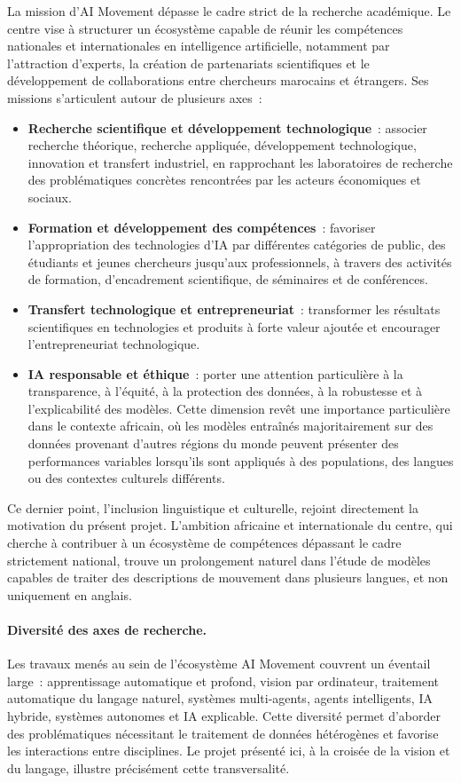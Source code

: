 \documentclass[12pt,a4paper,oneside]{report}
\theoremstyle{definition}
\theoremstyle{plain}
\begin{document}
La mission d'AI Movement dépasse le cadre strict de la recherche académique. Le
centre vise à structurer un écosystème capable de réunir les compétences
nationales et internationales en intelligence artificielle, notamment par
l'attraction d'experts, la création de partenariats scientifiques et le
développement de collaborations entre chercheurs marocains et étrangers. Ses
missions s'articulent autour de plusieurs axes~:

\begin{itemize}[leftmargin=*]
\item \textbf{Recherche scientifique et développement technologique}~: associer
recherche théorique, recherche appliquée, développement technologique, innovation
et transfert industriel, en rapprochant les laboratoires de recherche des
problématiques concrètes rencontrées par les acteurs économiques et sociaux.
\item \textbf{Formation et développement des compétences}~: favoriser
l'appropriation des technologies d'IA par différentes catégories de public, des
étudiants et jeunes chercheurs jusqu'aux professionnels, à travers des activités
de formation, d'encadrement scientifique, de séminaires et de conférences.
\item \textbf{Transfert technologique et entrepreneuriat}~: transformer les
résultats scientifiques en technologies et produits à forte valeur ajoutée et
encourager l'entrepreneuriat technologique.
\item \textbf{IA responsable et éthique}~: porter une attention particulière à la
transparence, à l'équité, à la protection des données, à la robustesse et à
l'explicabilité des modèles. Cette dimension revêt une importance particulière
dans le contexte africain, où les modèles entraînés majoritairement sur des
données provenant d'autres régions du monde peuvent présenter des performances
variables lorsqu'ils sont appliqués à des populations, des langues ou des
contextes culturels différents.
\end{itemize}

Ce dernier point, l'inclusion linguistique et culturelle, rejoint
directement la motivation du présent projet. L'ambition africaine et
internationale du centre, qui cherche à contribuer à un écosystème de
compétences dépassant le cadre strictement national, trouve un prolongement
naturel dans l'étude de modèles capables de traiter des descriptions de
mouvement dans plusieurs langues, et non uniquement en anglais.

\paragraph{Diversité des axes de recherche.} Les travaux menés au sein de
l'écosystème AI Movement couvrent un éventail large~: apprentissage automatique et
profond, vision par ordinateur, traitement automatique du langage naturel,
systèmes multi-agents, agents intelligents, IA hybride, systèmes autonomes et IA
explicable. Cette diversité permet d'aborder des problématiques nécessitant le
traitement de données hétérogènes et favorise les interactions entre disciplines.
Le projet présenté ici, à la croisée de la vision et du langage, illustre
précisément cette transversalité.
\end{document}
